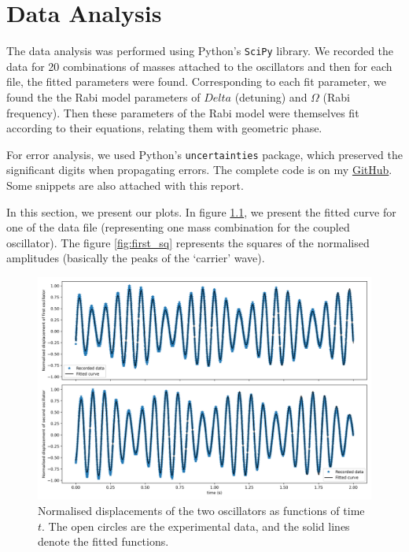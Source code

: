 \chapter{\label{method}Data Analysis}
The data analysis was performed using Python's \texttt{SciPy} library. We recorded the data for 20 combinations of masses attached to the oscillators and then for each file, the fitted parameters were found. Corresponding to each fit parameter, we found the the Rabi model parameters of $ Delta $ (detuning) and $ \Omega $ (Rabi frequency). Then these parameters of the Rabi model were themselves fit according to their equations, relating them with geometric phase.

For error analysis, we used Python's  \texttt{uncertainties} package, which preserved the significant digits when propagating errors. The complete code is on my \href{https://github.com/peakcipher/p442-integrated-lab/tree/master/IV.%20Coupled%20Oscillator}{GitHub}. Some snippets are also attached with this report.

In this section, we present our plots. In figure \ref{fig:first}, we present the fitted curve for one of the data file (representing one mass combination for the coupled oscillator). The figure \ref{fig:first_sq} represents the squares of the normalised amplitudes (basically the peaks of the `carrier' wave).

\begin{figure}[H]
	\centering
	\includegraphics[scale=0.4]{01.png}
	\caption{Normalised displacements of the two oscillators as functions of time $ t $. The
		open circles are the experimental data, and the solid lines denote the fitted functions.}
	\label{fig:first}
\end{figure}

